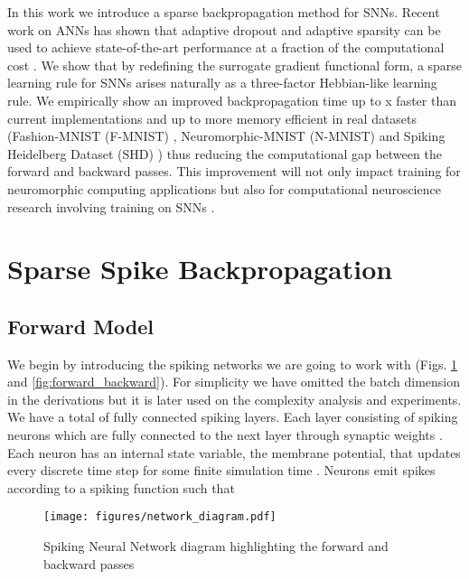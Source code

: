 \documentclass{article}
\begin{document}
In this work we introduce a sparse backpropagation method for SNNs. Recent work on ANNs has shown that adaptive dropout \cite{frey13adaptive} and adaptive sparsity \cite{blanc2018adaptive} can be used to achieve state-of-the-art performance at a fraction of the computational cost \cite{chen2019slide, daghaghi2021accelerating}. We show that by redefining the surrogate gradient functional form, a sparse learning rule for SNNs arises naturally as a three-factor Hebbian-like learning rule. We empirically show an improved backpropagation time up to x faster than current implementations and up to  more memory efficient in real datasets (Fashion-MNIST (F-MNIST) \cite{xiao2017fashion}, Neuromorphic-MNIST (N-MNIST) \cite{orchard2015converting} and Spiking Heidelberg Dataset (SHD) \cite{cramer2020heidelberg})  thus reducing the computational gap between the forward and backward passes. This improvement will not only impact training for neuromorphic computing applications but also for computational neuroscience research involving training on SNNs \cite{perez2021neural}.


\section{Sparse Spike Backpropagation }\label{section:main_text}

\subsection{Forward Model}

We begin by introducing the spiking networks we are going to work with (Figs. \ref{fig:schematic} and \ref{fig:forward_backward}). For simplicity we have omitted the batch dimension in the derivations but it is later used on the complexity analysis and experiments. We have a total of  fully connected spiking layers. Each layer  consisting of  spiking neurons which are fully connected to the next layer  through synaptic weights . Each neuron has an internal state variable, the membrane potential,  that updates every discrete time step  for some finite simulation time . Neurons emit spikes according to a spiking function  such that 



\begin{figure}[!tb]
\centering
\texttt{[image: figures/network\_diagram.pdf]}
\caption{Spiking Neural Network diagram highlighting the forward and backward passes}
\label{fig:schematic}
\vspace{-0.5cm}
\end{figure}
\end{document}
